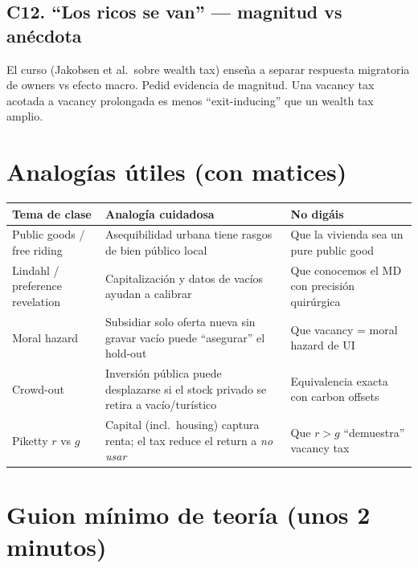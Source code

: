 \documentclass[11pt,a4paper]{report}
\begin{document}
\subsection{C12. ``Los ricos se van'' --- magnitud vs an\'ecdota}

\begin{intuicion}
El curso (Jakobsen et al.\ sobre wealth tax) ense\~na a separar respuesta
migratoria de owners vs efecto macro. Pedid evidencia de magnitud.
Una vacancy tax acotada a vacancy prolongada es menos ``exit-inducing''
que un wealth tax amplio.
\end{intuicion}

\section{Analog\'ias \'utiles (con matices)}

\begin{center}
\renewcommand{\arraystretch}{1.2}
\begin{tabularx}{\textwidth}{@{}>{\raggedright\arraybackslash}p{3.2cm}
  >{\raggedright\arraybackslash}X
  >{\raggedright\arraybackslash}X@{}}
\toprule
\textbf{Tema de clase} & \textbf{Analog\'ia cuidadosa} & \textbf{No dig\'ais} \\
\midrule
Public goods / free riding &
Asequibilidad urbana tiene rasgos de bien p\'ublico local &
Que la vivienda sea un pure public good \\
Lindahl / preference revelation &
Capitalizaci\'on y datos de vac\'ios ayudan a calibrar &
Que conocemos el MD con precisi\'on quir\'urgica \\
Moral hazard &
Subsidiar solo oferta nueva sin gravar vac\'io puede ``asegurar'' el hold-out &
Que vacancy = moral hazard de UI \\
Crowd-out &
Inversi\'on p\'ublica puede desplazarse si el stock privado se retira a vac\'io/tur\'istico &
Equivalencia exacta con carbon offsets \\
Piketty $r$ vs $g$ &
Capital (incl.\ housing) captura renta; el tax reduce el return a \emph{no usar} &
Que $r>g$ ``demuestra'' vacancy tax \\
\bottomrule
\end{tabularx}
\end{center}

\section{Guion m\'inimo de teor\'ia (unos 2 minutos)}
\end{document}
